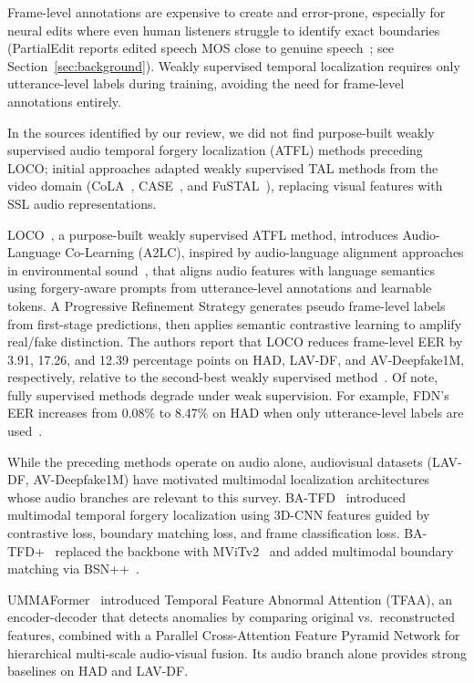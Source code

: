 \documentclass[journal]{IEEEtran}
\begin{document}
Frame-level annotations are expensive to create and error-prone, especially for neural edits where even human listeners struggle to identify exact boundaries (PartialEdit reports edited speech MOS close to genuine speech~\cite{zhang2025partialedit}; see Section~\ref{sec:background}). Weakly supervised temporal localization requires only utterance-level labels during training, avoiding the need for frame-level annotations entirely.

In the sources identified by our review, we did not find purpose-built weakly supervised audio temporal forgery localization (ATFL) methods preceding LOCO; initial approaches adapted weakly supervised TAL methods from the video domain (CoLA~\cite{zhang2021cola}, CASE~\cite{liu2023case}, and FuSTAL~\cite{feng2024fustal}), replacing visual features with SSL audio representations.

LOCO~\cite{10.24963/ijcai.2025/65}, a purpose-built weakly supervised ATFL method, introduces Audio-Language Co-Learning (A2LC), inspired by audio-language alignment approaches in environmental sound~\cite{ouajdi2024envfake}, that aligns audio features with language semantics using forgery-aware prompts from utterance-level annotations and learnable tokens. A Progressive Refinement Strategy generates pseudo frame-level labels from first-stage predictions, then applies semantic contrastive learning to amplify real/fake distinction. The authors report that LOCO reduces frame-level EER by 3.91, 17.26, and 12.39 percentage points on HAD, LAV-DF, and AV-Deepfake1M, respectively, relative to the second-best weakly supervised method~\cite{10.24963/ijcai.2025/65}. Of note, fully supervised methods degrade under weak supervision. For example, FDN's EER increases from 0.08\% to 8.47\% on HAD when only utterance-level labels are used~\cite{10.24963/ijcai.2025/65}.



While the preceding methods operate on audio alone, audiovisual datasets (LAV-DF, AV-Deepfake1M) have motivated multimodal localization architectures whose audio branches are relevant to this survey. BA-TFD~\cite{cai2022lavdf} introduced multimodal temporal forgery localization using 3D-CNN features guided by contrastive loss, boundary matching loss, and frame classification loss. BA-TFD+~\cite{cai2023lavdf_cviu} replaced the backbone with MViTv2~\cite{li2022mvitv2} and added multimodal boundary matching via BSN++~\cite{su2021bsnpp}.

UMMAFormer~\cite{zhang2023ummaformer} introduced Temporal Feature Abnormal Attention (TFAA), an encoder-decoder that detects anomalies by comparing original vs.\ reconstructed features, combined with a Parallel Cross-Attention Feature Pyramid Network for hierarchical multi-scale audio-visual fusion. Its audio branch alone provides strong baselines on HAD and LAV-DF.
\end{document}
